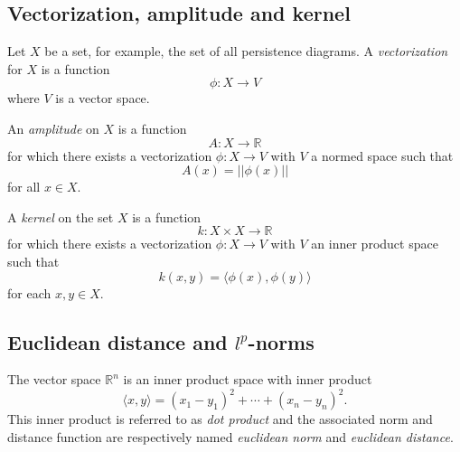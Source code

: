 \documentclass{amsart}
\begin{document}
	\subsection*{Vectorization, amplitude and kernel} \label{vectorization_amplitude_and_kernel}	
	
	Let $X$ be a set, for example, the set of all
	persistence diagrams. A \textit{vectorization} for $X$ is a function	
	\begin{equation*}	
	\phi : X \to V	
	\end{equation*}	
	where $V$ is a vector space. 
	
	An \textit{amplitude} on $X$ is a function	
	\begin{equation*}	
	A : X \to \mathbb R	
	\end{equation*}	
	for which there exists a vectorization $\phi : X \to V$ with $V$ a
	normed space such that	
	\begin{equation*}	
	A(x) = ||\phi(x)||	
	\end{equation*}	
	for all $x \in X$.
	
	A \textit{kernel} on the set $X$ is a function	
	\begin{equation*}	
	k : X \times X \to \mathbb R	
	\end{equation*}	
	for which there exists a vectorization $\phi : X \to V$ with $V$ an
	inner product space such that	
	\begin{equation*}	
	k(x,y) = \langle \phi(x), \phi(y) \rangle	
	\end{equation*}	
	for each $x,y \in X$.
	
	\subsection*{Euclidean distance and $l^p$-norms} \label{euclidean_distance_and_norm}
	
	The vector space $\mathbb R^n$ is an 
	inner product space with inner product 
	\begin{equation*}
	\langle x, y \rangle = (x_1-y_1)^2 + \cdots + (x_n-y_n)^2.
	\end{equation*}
	This inner product is referred to as \textit{dot product} and the associated norm and distance function are respectively named \textit{euclidean norm} and \textit{euclidean distance}.
	
\end{document}
